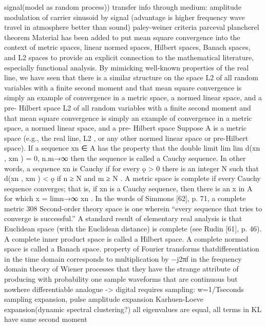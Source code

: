 \documentclass[12pt]{article}
\begin{document}
signal(model as random process))
transfer info through medium: amplitude modulation of carrier sinusoid by
signal (advantage is higher frequency wave travel in atmosphere better than
sound)
paley-weiner criteria
parceval plancherel theorem
Material
has been added to put mean square convergence into the context of metric
spaces, linear normed spaces, Hilbert spaces, Banach spaces, and L2 spaces
to provide an explicit connection to the mathematical literature, especially
functional analysis.
By mimicking well-known properties of the real line, we have seen that
there is a similar structure on the space L2 of all random variables with
a finite second moment and that mean square convergence is simply an
example of convergence in a metric space, a normed linear space, and a pre-
Hilbert space
L2 of all random variables with a finite second moment and that mean square convergence is simply an
example of convergence in a metric space, a normed linear space, and a pre-
Hilbert space
Suppose A is a metric space (e.g., the real line, L2 , or any other normed
linear space or pre-Hilbert space). If a sequence xn ∈ A has the property
that the double limit
lim lim d(xn , xm ) = 0,
n.m→∞
then the sequence is called a Cauchy sequence. In other words, a sequence
{xn } is Cauchy if for every ǫ > 0 there is an integer N such that d(xn , xm ) <
ǫ if n ≥ N and m ≥ N . A metric space is complete if every Cauchy sequence
converges; that is, if {xn } is a Cauchy sequence, then there is an x in A for
which x = limn→∞ xn . In the words of Simmons [62], p. 71, a complete metric
308
Second-order theory space is one wherein “every sequence that tries to converge is successful.” A
standard result of elementary real analysis is that Euclidean space (with the
Euclidean distance) is complete (see Rudin [61], p. 46).
A complete inner product space is called a Hilbert space.
A complete normed space is called a Banach space.
property of Fourier transforms thatdifferentiation in the time domain corresponds to multiplication by −j2πf
in the frequency domain
theory of Wiener processes that they have the
strange attribute of producing with probability one sample waveforms that
are continuous but nowhere differentiable
analogue -> digital requires sampling: w=1/Tseconds
sampling expansion, pulse amplitude expansion
Karhuen-Loeve expansion(dynamic spectral clustering?) all eigenvalues are
equal, all terms in KL have same second moment
\end{document}
